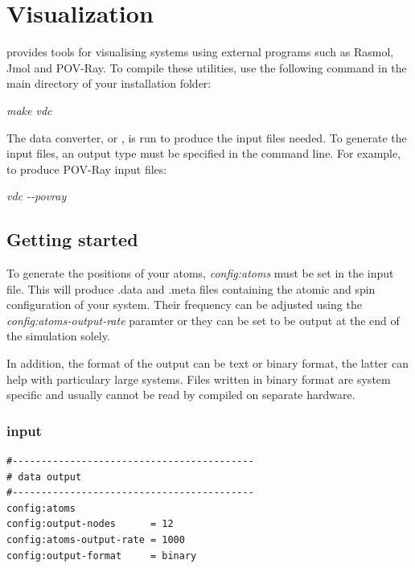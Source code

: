 \chapter{Visualization}\label{chap:visualization}

\vampire provides tools for visualising systems using external programs such as Rasmol, Jmol and POV-Ray. To compile these utilities, use the following command in the main directory of your \vampire installation folder:

\noindent
\begin{minipage}[c]{\textwidth}
\centering
\textit{make vdc}
\end{minipage}

The \vampire data converter, or \vdc, is run to produce the input files needed. To generate the input files, an output type must be specified in the command line. For example, to produce POV-Ray input files:

\noindent
\begin{minipage}[c]{\textwidth}
\centering
\textit{vdc -{}-povray}
\end{minipage}


\section*{Getting started}

To generate the positions of your atoms, \textit{config:atoms} must be set in the input file. This will produce .data and .meta files containing the atomic and spin configuration of your system. Their frequency can be adjusted using the \textit{config:atoms-output-rate} paramter or they can be set to be output at the end of the simulation solely.

In addition, the format of the output can be text or binary format, the latter can help with particulary large systems. Files written in binary format are system specific and usually cannot be read by \vdc compiled on separate hardware.

\subsection*{input}
{\footnotesize
\begin{verbatim}
#------------------------------------------
# data output
#------------------------------------------
config:atoms
config:output-nodes      = 12
config:atoms-output-rate = 1000
config:output-format     = binary
\end{verbatim}
}

